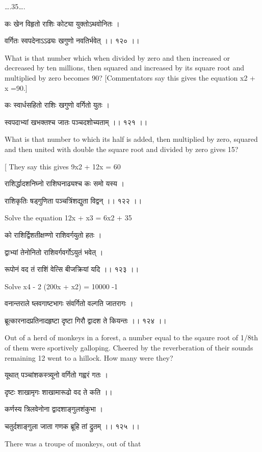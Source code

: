 \documentclass[]{article}
\date{}
\begin{document}
{\ldots{}.35\ldots{}.}

{कः खेन विहृतो राशिः कोट्या युक्तोऽथवोनितः । }

{वर्गितः स्वपदेनाऽऽढ्यः खगुणो नवतिर्भवेत् ।। १२० ।। }

{What is that number which when divided by zero and then increased or
decreased by ten millions, then squared and increased by its square root
and multiplied by zero becomes 90? {[}Commentators say this gives the
equation x}{2}{ + x =90.{]}}

{कः स्वार्धसहितो राशिः खगुणो वर्गितो युतः । }

{स्वपदाभ्यां खभक्तश्च जातः पञ्चदशोच्यताम् ।। १२१ ।। }

{What is that number to which its half is added, then multiplied by
zero, squared and then united with double the square root and divided by
zero gives 15?}

{{[} They say this gives 9x}{2}{ + 12x = 60}

{राशिर्द्धादशनिघ्नो राशिघनाढ्यश्च कः समो यस्य । }

{राशिकृतिः षड्गुणिता पञ्चत्रिंशद्युता विद्वन् ।। १२२ ।। }

{Solve the equation 12x + x}{3}{ = 6x}{2}{ + 35}

{को राशिर्द्विशतीक्षण्णो राशिवर्गयुतो हतः । }

{द्वाभ्यां तेनोनितो राशिवर्गवर्गोऽयुतं भवेत् । }

{रूपोनं वद तं राशिं वेत्सि बीजक्रियां यदि ।। १२३ ।। }

{Solve x}{4}{ - 2 (200x + x}{2}{) = 10000 -1}

{वनान्तराले ष्लवगाष्टभागः संवर्गितो वल्गति जातरागः । }

{ब्रूत्कारनादप्रतिनादहृष्टा दृष्टा गिरौ द्वादश ते कियन्तः ।। १२४ ।। }

{Out of a herd of monkeys in a forest, a number equal to the sqaure root
of 1/8th of them were sportively galloping. Cheered by the reverberation
of their sounds remaining 12 went to a hillock. How many were they? }

{यूथात् पञ्चांशकस्त्र्यूनो वर्गितो गह्वरं गतः । }

{दृष्टः शाखामृगः शाखामारूढो वद ते कति ।। }

{कर्णस्य त्रिलवेनोना द्वादशाङ्गुलशंकुभा । }

{चतुर्दशाङ्गुला जाता गणक ब्रूहि तां द्रुतम् ।। १२५ ।। }

{There was a troupe of monkeys, out of that\\
}
\end{document}
